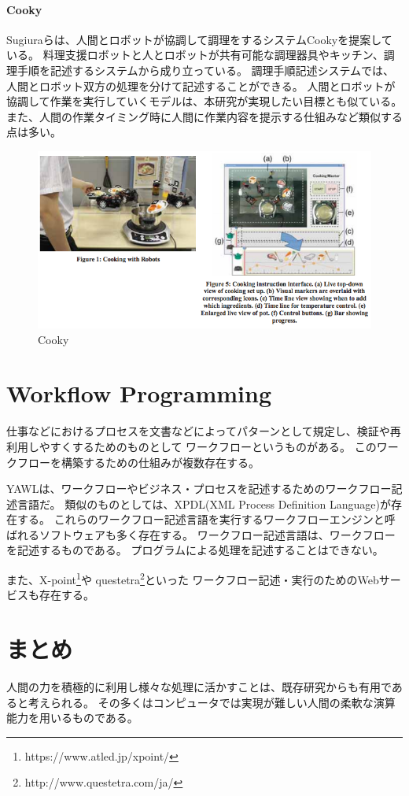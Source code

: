 \paragraph{Cooky}\label{cooky}

\mbox{}

Sugiuraらは、人間とロボットが協調して調理をするシステムCooky\cite{cooky}を提案している。
料理支援ロボットと人とロボットが共有可能な調理器具やキッチン、調理手順を記述するシステムから成り立っている。
調理手順記述システムでは、人間とロボット双方の処理を分けて記述することができる。
人間とロボットが協調して作業を実行していくモデルは、本研究が実現したい目標とも似ている。
また、人間の作業タイミング時に人間に作業内容を提示する仕組みなど類似する点は多い。

\begin{figure}[htbp]
  \begin{center}
  \includegraphics[width=.6\linewidth,bb=0 0 633 336]{images/cooky.png}
  \end{center}
  \caption{Cooky}
  \label{fig:cooky}
\end{figure}

\section{Workflow Programming}\label{workflow-programming}

仕事などにおけるプロセスを文書などによってパターンとして規定し、検証や再利用しやすくするためのものとして
ワークフローというものがある。
このワークフローを構築するための仕組みが複数存在する。

YAWL\cite{yawl}は、ワークフローやビジネス・プロセスを記述するためのワークフロー記述言語だ。
類似のものとしては、XPDL(XML Process Definition
Language)\cite{xpdl}が存在する。
これらのワークフロー記述言語を実行するワークフローエンジンと呼ばれるソフトウェアも多く存在する。
ワークフロー記述言語は、ワークフローを記述するものである。
プログラムによる処理を記述することはできない。

また、X-point\footnote{https://www.atled.jp/xpoint/}や
questetra\footnote{http://www.questetra.com/ja/}といった
ワークフロー記述・実行のためのWebサービスも存在する。

\section{まとめ}\label{ux307eux3068ux3081}

人間の力を積極的に利用し様々な処理に活かすことは、既存研究からも有用であると考えられる。
その多くはコンピュータでは実現が難しい人間の柔軟な演算能力を用いるものである。

